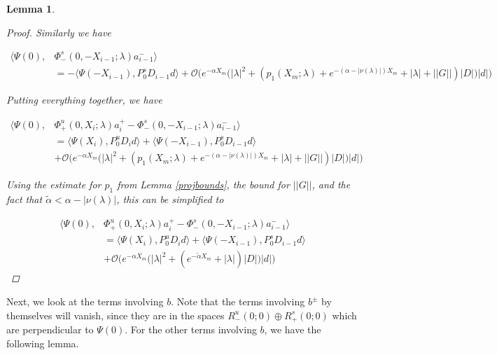\documentclass[12pt]{article}
\newtheorem{lemma}{Lemma}
\begin{document}
\begin{lemma}
\begin{proof}
Similarly we have

\begin{align*}
\langle \Psi(0), &\Phi^s_-(0, -X_{i-1}; \lambda)a_{i-1}^- \rangle \\
&= -\langle \Psi(-X_{i-1}), P^s_0 D_{i-1} d \rangle
+ \mathcal{O}\Big(e^{-\alpha X_m} \Big( |\lambda|^2  + (p_1(X_m; \lambda) + e^{-(\alpha - |\nu(\lambda)|) X_m} + |\lambda| + ||G|| )|D| \Big)|d| \Big)
\end{align*}

Putting everything together, we have

\begin{align*}
\langle \Psi(0), &\Phi^u_+(0, X_i; \lambda)a_i^+ - \Phi^s_-(0, -X_{i-1}; \lambda)a_{i-1}^- \rangle \\
&= \langle \Psi(X_i), P^u_0 D_i d \rangle + \langle \Psi(-X_{i-1}), P^s_0 D_{i-1} d \rangle \\
&+ \mathcal{O}\Big(e^{-\alpha X_m} \Big( |\lambda|^2  + (p_1(X_m; \lambda) + e^{-(\alpha - |\nu(\lambda)|) X_m} + |\lambda| + ||G|| )|D| \Big)|d| \Big)
\end{align*}

Using the estimate for $p_1$ from Lemma \ref{projbounds}, the bound for $||G||$, and the fact that $\tilde{\alpha} < \alpha - |\nu(\lambda)|$, this can be simplified to

\begin{align*}
\langle \Psi(0), &\Phi^u_+(0, X_i; \lambda)a_i^+ - \Phi^s_-(0, -X_{i-1}; \lambda)a_{i-1}^- \rangle \\
&= \langle \Psi(X_i), P^u_0 D_i d \rangle + \langle \Psi(-X_{i-1}), P^s_0 D_{i-1} d \rangle \\
&+ \mathcal{O}\Big(e^{-\alpha X_m} \Big( |\lambda|^2  + (e^{-\tilde{\alpha} X_m} + |\lambda|)|D| \Big)|d| \Big)
\end{align*}

\end{proof}
\end{lemma}

Next, we look at the terms involving $b$. Note that the terms involving $b^\pm$ by themselves will vanish, since they are in the spaces $R^u_-(0; 0) \oplus R^s_+(0; 0)$ which are perpendicular to $\Psi(0)$. For the other terms involving $b$, we have the following lemma.

\end{document}
